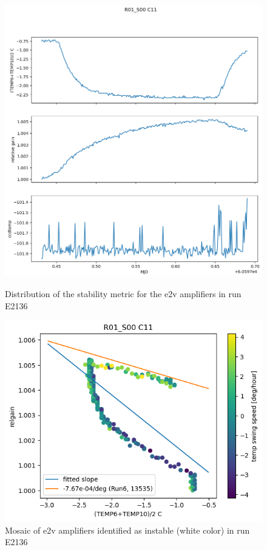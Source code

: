 \begin{figure}[htbp]
\centering
\begin{minipage}{0.45\textwidth}
    \centering
    \includegraphics[width=\textwidth]{sections/figures/RelgainParametersTrending.png}
    \caption{Distribution of the stability metric for the e2v amplifiers in run E2136}
\end{minipage}
\hfill
\begin{minipage}{0.45\textwidth}
    \centering
    \includegraphics[width=\textwidth]{sections/figures/RelgainDetail.png}
    \caption{Mosaic of e2v amplifiers identified as instable (white color) in run E2136}
\end{minipage}
\end{figure}


